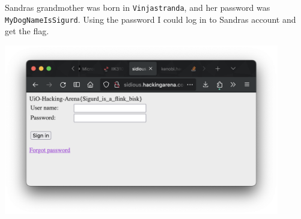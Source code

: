 Sandras grandmother was born in \texttt{Vinjastranda}, and her password was \texttt{MyDogNameIsSigurd}. Using the password I could log in to Sandras account and get the flag.

\begin{center}
    \includegraphics[width=12cm]{img/Web hacking/Arenabook/Skjermbilde 2023-10-26 kl. 14.55.36.png}
\end{center}